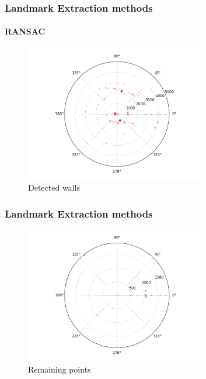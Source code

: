 \documentclass{beamer}
\begin{document}
		\begin{frame}
			\frametitle{Landmark Extraction methods}
			\framesubtitle{RANSAC}
			\begin{figure}
				\includegraphics[width=0.7\textwidth,height=0.7\textheight]{2Walls}
				\caption{Detected walls}
			\end{figure}
		\end{frame}
		
		\begin{frame}
			\frametitle{Landmark Extraction methods}
			\begin{figure}
				\includegraphics[width=0.7\textwidth,height=0.7\textheight]{3Unass}
				\caption{Remaining points}
			\end{figure}
		\end{frame}
				
\end{document}
